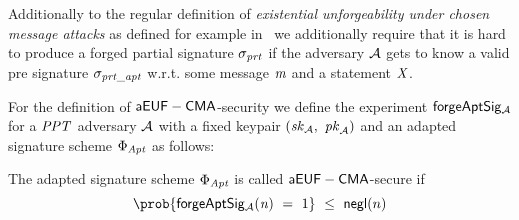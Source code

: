 \begin{definition}[$\cnstaEUFCMA$]\label{def:aeufcma}
Additionally to the regular definition of \textit{existential unforgeability under chosen message attacks} as defined for example in~\cite{vaudenay2006classical} we additionally require that it is hard to produce a forged partial signature $\sigma_{\mathit{prt}}$ if the
adversary $\mathcal{A}$ gets to know a valid pre signature $\sigma_{\mathit{prt\_apt}}$ w.r.t. some message $\mathit{m}$ and a statement $\mathit{X}$.

For the definition of $\cnstaEUFCMA$-security we define the experiment $\mathsf{forgeAptSig_{\mathcal{A}}}$ for a $\mathit{PPT}$ adversary $\mathcal{A}$ with a fixed keypair $(\mathit{sk}_{\mathcal{A}} ,~ \mathit{pk}_{\mathcal{A}})$ and an adapted signature scheme $\Phi_{\mathit{Apt}}$ as
follows:

\begin{center}
    \fbox{
    \begin{varwidth}{\textwidth}
        \procedure[linenumbering]{$\procExpForg{\varN}$} {
        \varSet \opAssign \cnstEmptySet \\
        (\varNonceAdv \opSeperate \varRandAdv) \opFunResult \procSetupPartSig{\varSecParam} \\
        \varMsg \opFunResult \cnstAdversary^{\procSignOracle{\cdot}{\varSecKey}{\varPubKey}}(\varPubKeyAdv \opSeperate \varRandAdv) \\
        \varSigPartApt \opFunResult \procGenPtAptSig{\varMsg}{\varSecKey}{\varNonce}{\varPubKeyAdv}{\varRandAdv}{\varWit} \\
        \varSigPart \opFunResult \cnstAdversary^{\procSignOracle{\cdot}{\varSecKey}{\varPubKey}}(\varSigPartApt) \\
        \varSigFin \opFunResult \procFinAptSig{\varSigPart}{\varSigPartApt}{\varWit}{\varRand}{\varRandAdv} \\
        \pcreturn (\varMsg \opNotIn \varSet \opAnd \procVerf{\varMsg}{\varSigFin}{\varPubKeyAdv \opAddPoint \varPubKey})
        }\\[2\baselineskip]
        \procedure[linenumbering]{$\procSignOracle{\varMsg}{\varPubKeyAdv}{\varRandAdv}$} {
        \varSet \opAssign \varSet \opUnion {\varMsg} \\
        ((\varNonce \opSeperate \varRand) \opSeperate (\varWit \opSeperate \varStatement)) \opFunResult \procSetupApt{\varSecParam} \\
        \pcreturn \procGenPtAptSig{\varMsg}{\varSecKey}{\varNonce}{\varPubKeyAdv}{\varRandAdv}{\varWit}
        }\\[2\baselineskip]
    \end{varwidth}
    }
\end{center}
The adapted signature scheme $\Phi_{\mathit{Apt}}$ is called $\cnstaEUFCMA$-secure if
\[ \prob{\procExpForg{\varN} \opEq 1} \opSmEq \funNegl{n} \]
\end{definition}

